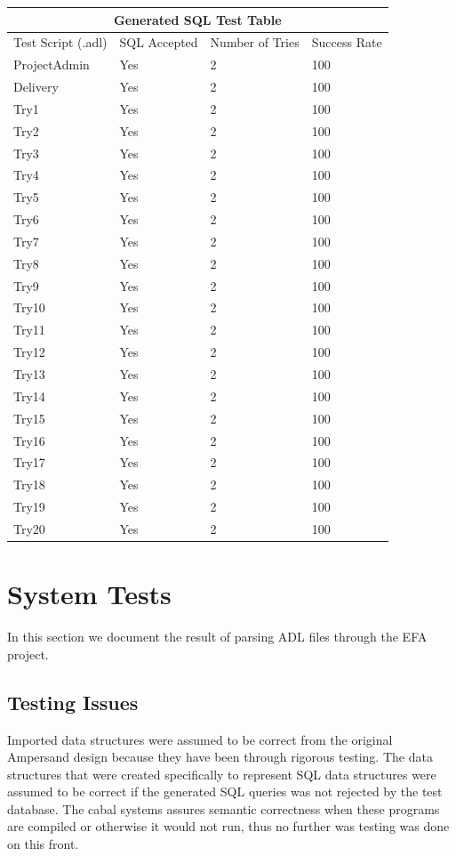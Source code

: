 \documentclass[12pt, svgnames]{article}
\begin{document}
\begin{adjustwidth}{-0.5cm}{}   
    \begin{tabular}[h!]{ |p{5cm}||p{3cm}|p{3cm}|p{3cm}|  }
        \hline
        \multicolumn{4}{|c|}{Generated SQL Test Table} \\
        \hline
        Test Script (.adl) & SQL Accepted & Number of Tries & Success Rate\\
        \hline
        ProjectAdmin & Yes    &2&   100\\
        Delivery&   Yes  & 2   &100\\
        Try1 &Yes & 2&  100\\
        Try2 &Yes & 2&  100\\
        Try3&   Yes  & 2&100\\
        Try4& Yes  & 2   &100\\
        Try5& Yes  & 2&100\\
        Try6& Yes  & 2&100\\
        Try7& Yes  & 2&100\\
        Try8& Yes  & 2&100\\
        Try9& Yes  & 2&100\\
        Try10& Yes  & 2&100\\
        Try11& Yes  & 2&100\\
        Try12& Yes  & 2&100\\
        Try13& Yes  & 2&100\\
        Try14& Yes  & 2&100\\
        Try15& Yes  & 2&100\\
        Try16& Yes  & 2&100\\
        Try17& Yes  & 2&100\\
        Try18& Yes  & 2&100\\
        Try19& Yes  & 2&100\\
        Try20& Yes  & 2 &100\\
        \hline
    \end{tabular}
\end{adjustwidth}

\section{System Tests}
In this section we document the result of parsing ADL files through the EFA project.   

\subsection {Testing Issues}
Imported data structures were assumed to be correct from the original Ampersand 
design because they have been through rigorous testing. The data structures 
that were created specifically to represent SQL data structures were assumed to 
be correct if the generated SQL queries was not rejected by the test database. 
The cabal systems assures semantic correctness when these programs are compiled 
or otherwise it would not run, thus no further was testing was done on this 
front.
\end{document}
